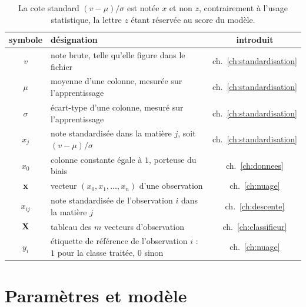 \begin{table}[htbp]
\centering
\begin{tabular}{c>{\raggedright\arraybackslash}p{74mm}c}
\toprule
symbole & désignation & introduit \\
\midrule
$v$ & note brute, telle qu'elle figure dans le fichier
  & ch.~\ref{ch:standardisation} \\
$\mu$ & moyenne d'une colonne, mesurée sur l'apprentissage
  & ch.~\ref{ch:standardisation} \\
$\sigma$ & écart-type d'une colonne, mesuré sur l'apprentissage
  & ch.~\ref{ch:standardisation} \\
$x_j$ & note standardisée dans la matière $j$, soit $(v-\mu)/\sigma$
  & ch.~\ref{ch:standardisation} \\
$x_0$ & colonne constante égale à $1$, porteuse du biais
  & ch.~\ref{ch:donnees} \\
$\mathbf{x}$ & vecteur $(x_0,x_1,\dots,x_n)$ d'une observation & ch.~\ref{ch:nuage} \\
$x_{ij}$ & note standardisée de l'observation $i$ dans la matière $j$
  & ch.~\ref{ch:descente} \\
$\mathbf{X}$ & tableau des $m$ vecteurs d'observation & ch.~\ref{ch:classifieur} \\
$y_i$ & étiquette de référence de l'observation $i$ : $1$ pour la classe
  traitée, $0$ sinon & ch.~\ref{ch:nuage} \\
\bottomrule
\end{tabular}
\caption{La cote standard $(v-\mu)/\sigma$ est notée $x$ et non $z$, contrairement
à l'usage statistique, la lettre $z$ étant réservée au score du modèle.}
\label{tab:not-donnees}
\end{table}

\section{Paramètres et modèle}

